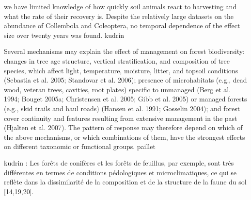   we have limited knowledge of how quickly soil animals react to harvesting and what the rate of their recovery is.
  Despite the relatively large datasets on the abundance of Collembola and Coleoptera, no temporal dependence of the effect size over twenty years was found. kudrin


  Several mechanisms may explain the effect of management on forest biodiversity: changes in tree age structure, vertical stratification, and composition of tree species, which affect light, temperature, moisture, litter, and topsoil conditions (Sebastia et al. 2005; Standovar et al. 2006); presence of microhabitats (e.g., dead wood, veteran trees, cavities, root plates) specific to unmanaged (Berg et al. 1994; Bouget 2005a; Christensen et al. 2005; Gibb et al. 2005) or managed forests (e.g., skid trails and haul roads) (Hansen et al. 1991; Gosselin 2004); and forest cover continuity and features resulting from extensive management in the past (Hjalten et al. 2007). The pattern of response may therefore depend on which of the above mechanisms, or which combinations of them, have the strongest effects on different taxonomic or functional groups. paillet 

  kudrin :
Les forêts de conifères et les forêts de feuillus, par exemple, sont très différentes en termes de conditions pédologiques et microclimatiques, ce qui se reflète dans la dissimilarité de la composition et de la structure de la faune du sol [14,19,20].



